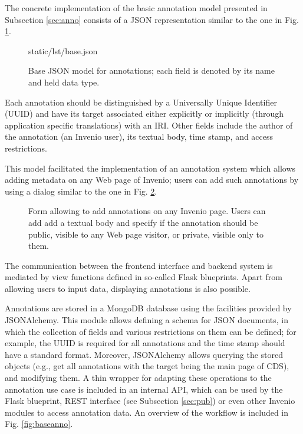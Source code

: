 
The concrete implementation of the basic annotation model presented in
Subsection \ref{sec:anno} consists of a JSON representation similar to the one
in Fig. \ref{lst:basejson}.

\begin{figure}[!ht]
  
    {static/lst/base.json}
  \caption[Base JSON model for annotations]
          {Base JSON model for annotations; each field is denoted by its name
           and held data type.}
  \label{lst:basejson}
\end{figure}

Each annotation should be distinguished by a Universally Unique Identifier
(UUID) and have its target associated either explicitly or implicitly (through
application specific translations) with an IRI. Other fields include the author
of the annotation (an Invenio user), its textual body, time stamp, and access
restrictions.

This model facilitated the implementation of an annotation system which allows
adding metadata on any Web page of Invenio; users can add such annotations by
using a dialog similar to the one in Fig. \ref{fig:annoform}.

\begin{figure}[!h]
  \centering
  \caption[Form allowing to add annotations on any Invenio page]
          {Form allowing to add annotations on any Invenio page. Users can add
           add a textual body and specify if the annotation should be public,
           visible to any Web page visitor, or private, visible only to them.}
  \label{fig:annoform}
\end{figure}

The communication between the frontend interface and backend system is mediated
by view functions defined in so-called Flask blueprints. Apart from allowing
users to input data, displaying annotations is also possible.

Annotations are stored in a MongoDB database \cite{ref:mongo} using the
facilities provided by JSONAlchemy. This module allows defining a schema for
JSON documents, in which the collection of fields and various restrictions on
them can be defined; for example, the UUID is required for all annotations and
the time stamp should have a standard format. Moreover, JSONAlchemy allows
querying the stored objects (e.g., get all annotations with the target being
the main page of CDS), and modifying them. A thin wrapper for adapting these
operations to the annotation use case is included in an internal API, which can
be used by the Flask blueprint, REST interface (see Subsection \ref{sec:pub})
or even other Invenio modules to access annotation data. An overview of the
workflow is included in Fig. \ref{fig:baseanno}.

